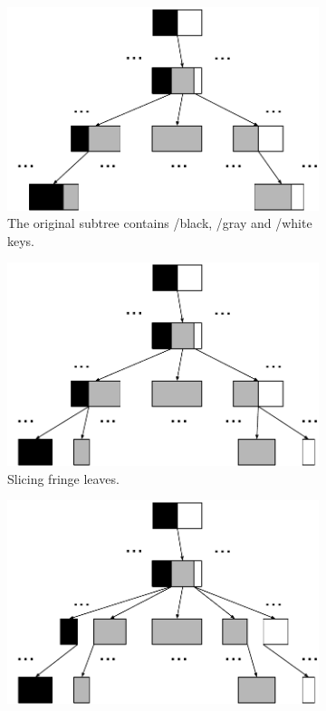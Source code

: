 \begin{figure}
  \begin{subfigure}{.45\textwidth}
    \centering
    \includegraphics[width=.9\linewidth]{fig/slice-1}
    \caption{The original subtree contains /black, /gray and /white keys.}
    \label{subfig:slice-1}
  \end{subfigure}
  \begin{subfigure}{.45\textwidth}
    \centering
    \includegraphics[width=.9\linewidth]{fig/slice-2}
    \caption{Slicing fringe leaves.}
    \label{subfig:slice-2}
  \end{subfigure}
  \begin{subfigure}{.45\textwidth}
    \centering
    \includegraphics[width=.9\linewidth]{fig/slice-3}

\end{subfigure}
\end{figure}
